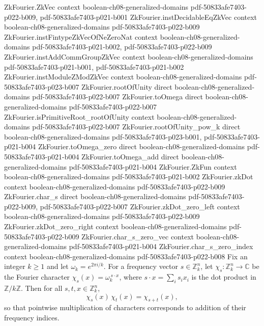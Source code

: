 \begin{lemma}
\label{ZkFourier.char_s_mul}
\leanok
{}
\proofstep
  {ZkFourier.ZkVec}
  {context}
  {boolean-ch08-generalized-domains}
  {pdf-50833afe7403-p022-b009,
    pdf-50833afe7403-p021-b001}
\proofstep
  {ZkFourier.instDecidableEqZkVec}
  {context}
  {boolean-ch08-generalized-domains}
  {pdf-50833afe7403-p022-b009}
\proofstep
  {ZkFourier.instFintypeZkVecOfNeZeroNat}
  {context}
  {boolean-ch08-generalized-domains}
  {pdf-50833afe7403-p021-b002,
    pdf-50833afe7403-p022-b009}
\proofstep
  {ZkFourier.instAddCommGroupZkVec}
  {context}
  {boolean-ch08-generalized-domains}
  {pdf-50833afe7403-p021-b001,
    pdf-50833afe7403-p021-b002}
\proofstep
  {ZkFourier.instModuleZModZkVec}
  {context}
  {boolean-ch08-generalized-domains}
  {pdf-50833afe7403-p023-b007}
\proofstep
  {ZkFourier.rootOfUnity}
  {direct}
  {boolean-ch08-generalized-domains}
  {pdf-50833afe7403-p022-b007}
\proofstep
  {ZkFourier.toOmega}
  {direct}
  {boolean-ch08-generalized-domains}
  {pdf-50833afe7403-p022-b007}
\proofstep
  {ZkFourier.isPrimitiveRoot_rootOfUnity}
  {context}
  {boolean-ch08-generalized-domains}
  {pdf-50833afe7403-p022-b007}
\proofstep
  {ZkFourier.rootOfUnity_pow_k}
  {direct}
  {boolean-ch08-generalized-domains}
  {pdf-50833afe7403-p023-b001,
    pdf-50833afe7403-p021-b004}
\proofstep
  {ZkFourier.toOmega_zero}
  {direct}
  {boolean-ch08-generalized-domains}
  {pdf-50833afe7403-p021-b004}
\proofstep
  {ZkFourier.toOmega_add}
  {direct}
  {boolean-ch08-generalized-domains}
  {pdf-50833afe7403-p021-b004}
\proofstep
  {ZkFourier.ZkFun}
  {context}
  {boolean-ch08-generalized-domains}
  {pdf-50833afe7403-p021-b002}
\proofstep
  {ZkFourier.zkDot}
  {context}
  {boolean-ch08-generalized-domains}
  {pdf-50833afe7403-p022-b009}
\proofstep
  {ZkFourier.char_s}
  {direct}
  {boolean-ch08-generalized-domains}
  {pdf-50833afe7403-p022-b009,
    pdf-50833afe7403-p022-b007}
\proofstep
  {ZkFourier.zkDot_zero_left}
  {context}
  {boolean-ch08-generalized-domains}
  {pdf-50833afe7403-p022-b009}
\proofstep
  {ZkFourier.zkDot_zero_right}
  {context}
  {boolean-ch08-generalized-domains}
  {pdf-50833afe7403-p022-b009}
\proofstep
  {ZkFourier.char_s_zero_vec}
  {context}
  {boolean-ch08-generalized-domains}
  {pdf-50833afe7403-p021-b004}
\proofstep
  {ZkFourier.char_s_zero_index}
  {context}
  {boolean-ch08-generalized-domains}
  {pdf-50833afe7403-p022-b008}
Fix an integer $k \ge 1$ and let $\omega_k = e^{2\pi i/k}$. For a frequency vector $s
\in \mathbb{Z}_k^n$, let $\chi_s \colon \mathbb{Z}_k^n \to \mathbb{C}$ be the Fourier
character $\chi_s(x) = \omega_k^{\,s \cdot x}$, where $s \cdot x = \sum_{i} s_i x_i$ is
the dot product in $\mathbb{Z}/k\mathbb{Z}$. Then for all $s, t, x \in \mathbb{Z}_k^n$,
\[
\chi_s(x)\,\chi_t(x) = \chi_{s+t}(x),
\]
so that pointwise multiplication of characters corresponds to addition of their
frequency indices.
\end{lemma}

